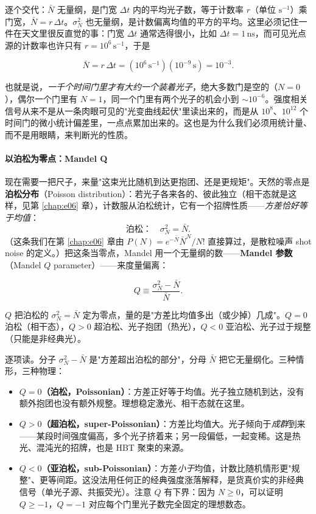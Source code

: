 逐个交代：\(\bar N\) 无量纲，是门宽 \(\Delta t\) 内的平均光子数，等于计数率 \(r\)（单位 \(\mathrm{s^{-1}}\)）乘门宽，\(\bar N=r\,\Delta t\)。\(\sigma_N^2\) 也无量纲，是计数偏离均值的平方的平均。这里必须记住一件在天文里很反直觉的事：门宽 \(\Delta t\) 通常选得很小，比如 \(\Delta t=1\,\mathrm{ns}\)，而可见光点源的计数率也许只有 \(r=10^6\,\mathrm{s^{-1}}\)，于是

\[
  \bar N=r\,\Delta t=(10^6\,\mathrm{s^{-1}})(10^{-9}\,\mathrm{s})=10^{-3}.
\]

也就是说，\emph{一千个时间门里才有大约一个装着光子}，绝大多数门是空的（\(N=0\)），偶尔一个门里有 \(N=1\)，同一个门里有两个光子的机会小到 \(\sim10^{-6}\)。强度相关信号从来不是从一条肉眼可见的"光变曲线起伏"里读出来的，而是从 \(10^8\)、\(10^{12}\) 个时间门的微小统计偏差里，一点点累加出来的。这也是为什么我们必须用统计量、而不是用眼睛，来判断光的性质。

\paragraph{以泊松为零点：Mandel Q}
\label{sec:e07-mandel-q}

现在需要一把尺子，来量"这束光比随机到达更抱团、还是更规矩"。天然的零点是\textbf{泊松分布}（Poisson distribution）：若光子各来各的、彼此独立（相干态就是这样，见第 \ref{chap:e06} 章），计数服从泊松统计，它有一个招牌性质——\emph{方差恰好等于均值}：
\[
  \text{泊松：}\quad \sigma_N^2=\bar N .
\]
（这条我们在第 \ref{chap:e06} 章由 \(P(N)=e^{-\bar N}\bar N^N/N!\) 直接算过，是散粒噪声 shot noise 的定义。）把这条当零点，Mandel 用一个无量纲的数——\textbf{Mandel 参数}（Mandel \(Q\) parameter）——来度量偏离：

\begin{equation}
  Q\equiv\frac{\sigma_N^2-\bar N}{\bar N}.
  \label{eq:e07-mandel-q}
\end{equation}
\begin{formulaexplain}
\(Q\) 把泊松的 \(\sigma_N^2=\bar N\) 定为零点，量的是"方差比均值多出（或少掉）几成"。\(Q=0\) 泊松（相干态），\(Q>0\) 超泊松、光子抱团（热光），\(Q<0\) 亚泊松、光子过于规整（只能是非经典光）。
\end{formulaexplain}

逐项读。分子 \(\sigma_N^2-\bar N\) 是"方差超出泊松的部分"，分母 \(\bar N\) 把它无量纲化。三种情形，三种物理：

\begin{itemize}
  \item \textbf{\(Q=0\)（泊松，Poissonian）}：方差正好等于均值。光子独立随机到达，没有额外抱团也没有额外规整。理想稳定激光、相干态就在这里。
  \item \textbf{\(Q>0\)（超泊松，super-Poissonian）}：方差比均值大。光子倾向于\emph{成群}到来——某段时间强度偏高，多个光子挤着来；另一段偏低，一起变稀。这是热光、混沌光的招牌，也是 HBT 聚束的来源。
  \item \textbf{\(Q<0\)（亚泊松，sub-Poissonian）}：方差\emph{小于}均值，计数比随机情形更"规整"、更等间距。这没法用任何正的经典强度涨落解释，是货真价实的非经典信号（单光子源、共振荧光）。注意 \(Q\) 有下界：因为 \(N\ge0\)，可以证明 \(Q\ge-1\)，\(Q=-1\) 对应每个门里光子数完全固定的理想数态。
\end{itemize}

